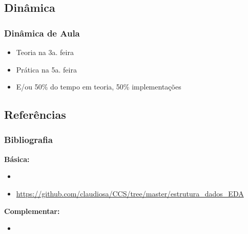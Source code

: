\subsection{Dinâmica}
\begin{frame}

    \frametitle{Dinâmica de Aula}

    \begin{itemize}
      
      \item Teoria na 3a. feira
      \item Prática na 5a. feira
      \item E/ou 50\% do tempo em teoria, 50\% implementações 
      
    \end{itemize}
\end{frame}




\subsection{Referências}  

\begin{frame}[allowframebreaks=0.9]
\frametitle{Bibliografia}  

\textbf{Básica:} 
\begin{itemize}

\item 

\item \url{https://github.com/claudiosa/CCS/tree/master/estrutura_dados_EDA}

\end{itemize}

\textbf{Complementar:}

\begin{itemize}
\item 


\end{itemize}

\end{frame}





